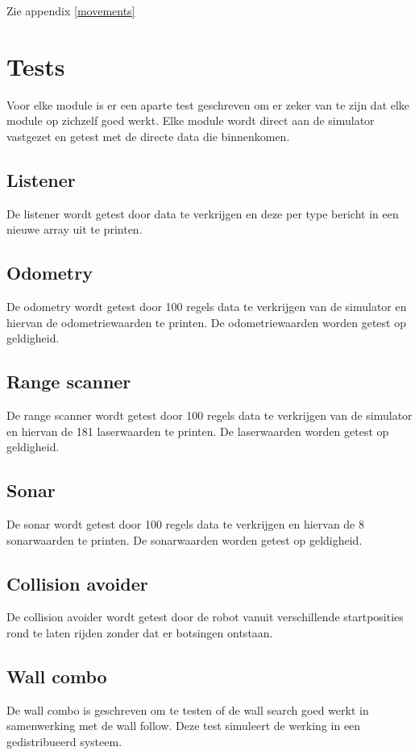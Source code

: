 \documentclass[a4paper,10pt]{article}
\begin{document}
Zie appendix \ref{movements}

\section{Tests}
Voor elke module is er een aparte test geschreven om er zeker van te zijn dat elke module op zichzelf goed werkt. Elke module wordt direct aan de simulator vastgezet en getest met de directe data die binnenkomen. 

\subsection{Listener}
De listener wordt getest door data te verkrijgen en deze per type bericht in een nieuwe array uit te printen.

\subsection{Odometry}
De odometry wordt getest door 100 regels data te verkrijgen van de simulator en hiervan de odometriewaarden te printen. De odometriewaarden worden getest op geldigheid.

\subsection{Range scanner}
De range scanner wordt getest door 100 regels data te verkrijgen van de simulator en hiervan de 181 laserwaarden te printen. De laserwaarden worden getest op geldigheid.

\subsection{Sonar}
De sonar wordt getest door 100 regels data te verkrijgen en  hiervan de 8 sonarwaarden te printen. De sonarwaarden worden getest op geldigheid.

\subsection{Collision avoider}
De collision avoider wordt getest door de robot vanuit verschillende startposities rond te laten rijden zonder dat er botsingen ontstaan.

\subsection{Wall combo}
De wall combo is geschreven om te testen of de wall search goed werkt in samenwerking met de wall follow. Deze test simuleert
de werking in een gedistribueerd systeem.
\end{document}
